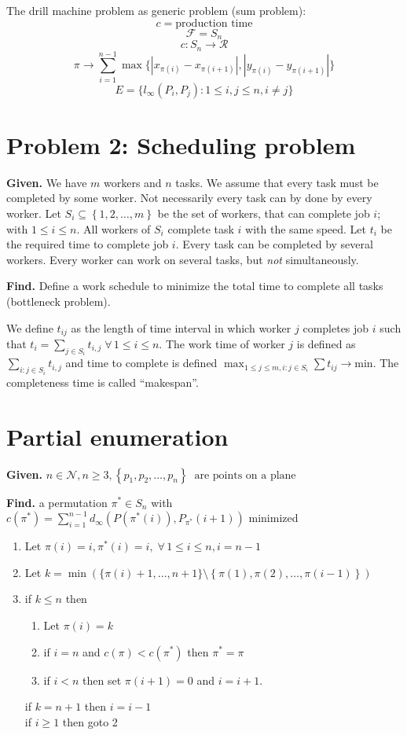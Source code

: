 \documentclass{article}
\newcommand{\set}[1]{\left\{#1\right\}}
\newcommand{\given}[1]{\textbf{Given.} #1\par}
\newcommand{\find}[1]{\textbf{Find.} #1\par}
\newcommand{\fall}{\;\forall\,}
\begin{document}
The drill machine problem as generic problem (sum problem):
\[
    c = \text{production time}
\] \[
    \mathcal{F} = S_n
\] \[
    c: S_n \rightarrow \mathcal{R}
\] \[
    \pi \rightarrow \sum_{i=1}^{n-1} \max\{|x_{\pi(i)} - x_{\pi(i+1)}|, |y_{\pi(i)} - y_{\pi(i+1)}|\}
\] \[
    E = \{l_\infty(P_i, P_j): 1 \leq i, j \leq n, i \neq j\}
\]

\section{Problem 2: Scheduling problem}
%
\given{We have $m$ workers and $n$ tasks. We assume that every task must be completed by some worker. Not necessarily every task can by done by every worker. Let $S_i \subseteq \set{1, 2, \ldots, m}$ be the set of workers, that can complete job $i$; with $1 \leq i \leq n$. All workers of $S_i$ complete task $i$ with the same speed. Let $t_i$ be the required time to complete job $i$. Every task can be completed by several workers. Every worker can work on several tasks, but \emph{not} simultaneously.}
\find{Define a work schedule to minimize the total time to complete all tasks (bottleneck problem).}

We define $t_{ij}$ as the length of time interval in which worker $j$ completes job $i$ such that $t_i = \sum_{j \in S_i} t_{i,j} \fall 1 \leq i \leq n$. The work time of worker $j$ is defined as $\sum_{i: j \in S_i} t_{i,j}$ and time to complete is defined $\max_{1 \leq j \leq m, i: j \in S_i} \sum t_{ij} \rightarrow \text{min}$. The completeness time is called ``makespan''.

\section{Partial enumeration}
%
\given{$n \in \mathcal{N}, n \geq 3, \set{p_1, p_2, \ldots, p_n}\ \text{ are points on a plane}$}
\find{a permutation $\pi^* \in S_n$ with $c(\pi^*) = \sum_{i=1}^{n-1} d_\infty(P(\pi^*(i)), P_{\pi^*}(i+1))$ minimized}

\begin{enumerate}
  \item Let $\pi(i) = i, \pi^*(i) = i, \fall 1 \leq i \leq n, i = n - 1$
  \item Let $k = \min(\{\pi(i) + 1, \ldots, n+1\} \setminus \set{\pi(1), \pi(2), \ldots, \pi(i-1)})$
  \item if $k \leq n$ then
    \begin{enumerate}
      \item Let $\pi(i) = k$
      \item if $i = n$ and $c(\pi) < c(\pi^*)$ then $\pi^* = \pi$
      \item if $i < n$ then set $\pi(i+1) = 0$ and $i = i + 1$.
    \end{enumerate}
    if $k = n + 1$ then $i = i - 1$ \\
    if $i \geq 1$ then goto 2
\end{enumerate}
\end{document}
